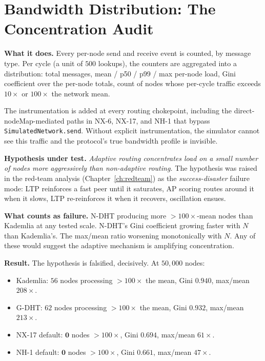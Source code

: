 \documentclass[twoside,nobib]{tufte-book}
\newcommand{\NDHT}{N-DHT\xspace}
\newcommand{\GDHT}{G-DHT\xspace}
\begin{document}
\section{Bandwidth Distribution: The Concentration Audit}

\textbf{What it does.} Every per-node send and receive event is
counted, by message type. Per cycle (a unit of $500$ lookups),
the counters are aggregated into a distribution: total messages,
mean / p50 / p99 / max per-node load, Gini coefficient over the
per-node totals, count of nodes whose per-cycle traffic exceeds
$10\times$ or $100\times$ the network mean.

The instrumentation is added at every routing chokepoint,
including the direct-nodeMap-mediated paths in NX-6, NX-17,
and NH-1 that bypass \texttt{SimulatedNetwork.send}. Without
explicit instrumentation, the simulator cannot see this traffic
and the protocol's true bandwidth profile is invisible.

\textbf{Hypothesis under test.} \emph{Adaptive routing
concentrates load on a small number of nodes more aggressively
than non-adaptive routing.} The hypothesis was raised in the
red-team analysis (Chapter~\ref{ch:redteam}) as the
\emph{success-disaster} failure mode: LTP reinforces a fast peer
until it saturates, AP scoring routes around it when it slows,
LTP re-reinforces it when it recovers, oscillation ensues.

\textbf{What counts as failure.} \NDHT producing more
$>100\times$-mean nodes than Kademlia at any tested scale.
\NDHT's Gini coefficient growing faster with $N$ than
Kademlia's. The max/mean ratio worsening monotonically with $N$.
Any of these would suggest the adaptive mechanism is amplifying
concentration.

\textbf{Result.} The hypothesis is falsified, decisively. At
$50{,}000$ nodes:

\begin{itemize}\setlength\itemsep{0.1em}
  \item Kademlia: $56$ nodes processing $>100\times$ the mean,
    Gini $0.940$, max/mean $208\times$.
  \item \GDHT: $62$ nodes processing $>100\times$ the mean,
    Gini $0.932$, max/mean $213\times$.
  \item NX-17 default: $\mathbf{0}$ nodes $>100\times$, Gini $0.694$,
    max/mean $61\times$.
  \item NH-1 default: $\mathbf{0}$ nodes $>100\times$, Gini $0.661$,
    max/mean $47\times$.
\end{itemize}
\end{document}
